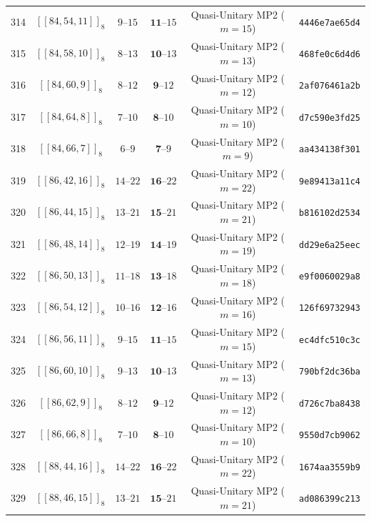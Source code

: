 \documentclass[11pt,a4paper]{article}
\theoremstyle{remark}
\begin{document}
{\begin{longtable}{@{}rccccl@{}}
314 & $[[84,54,11]]_{8}$ & $9\text{--}15$ & $\mathbf{11}\text{--}15$ & Quasi-Unitary MP2 ($m=15$) & \texttt{4446e7ae65d4} \\
315 & $[[84,58,10]]_{8}$ & $8\text{--}13$ & $\mathbf{10}\text{--}13$ & Quasi-Unitary MP2 ($m=13$) & \texttt{468fe0c6d4d6} \\
316 & $[[84,60,9]]_{8}$ & $8\text{--}12$ & $\mathbf{9}\text{--}12$ & Quasi-Unitary MP2 ($m=12$) & \texttt{2af076461a2b} \\
317 & $[[84,64,8]]_{8}$ & $7\text{--}10$ & $\mathbf{8}\text{--}10$ & Quasi-Unitary MP2 ($m=10$) & \texttt{d7c590e3fd25} \\
318 & $[[84,66,7]]_{8}$ & $6\text{--}9$ & $\mathbf{7}\text{--}9$ & Quasi-Unitary MP2 ($m=9$) & \texttt{aa434138f301} \\
319 & $[[86,42,16]]_{8}$ & $14\text{--}22$ & $\mathbf{16}\text{--}22$ & Quasi-Unitary MP2 ($m=22$) & \texttt{9e89413a11c4} \\
320 & $[[86,44,15]]_{8}$ & $13\text{--}21$ & $\mathbf{15}\text{--}21$ & Quasi-Unitary MP2 ($m=21$) & \texttt{b816102d2534} \\
321 & $[[86,48,14]]_{8}$ & $12\text{--}19$ & $\mathbf{14}\text{--}19$ & Quasi-Unitary MP2 ($m=19$) & \texttt{dd29e6a25eec} \\
322 & $[[86,50,13]]_{8}$ & $11\text{--}18$ & $\mathbf{13}\text{--}18$ & Quasi-Unitary MP2 ($m=18$) & \texttt{e9f0060029a8} \\
323 & $[[86,54,12]]_{8}$ & $10\text{--}16$ & $\mathbf{12}\text{--}16$ & Quasi-Unitary MP2 ($m=16$) & \texttt{126f69732943} \\
324 & $[[86,56,11]]_{8}$ & $9\text{--}15$ & $\mathbf{11}\text{--}15$ & Quasi-Unitary MP2 ($m=15$) & \texttt{ec4dfc510c3c} \\
325 & $[[86,60,10]]_{8}$ & $9\text{--}13$ & $\mathbf{10}\text{--}13$ & Quasi-Unitary MP2 ($m=13$) & \texttt{790bf2dc36ba} \\
326 & $[[86,62,9]]_{8}$ & $8\text{--}12$ & $\mathbf{9}\text{--}12$ & Quasi-Unitary MP2 ($m=12$) & \texttt{d726c7ba8438} \\
327 & $[[86,66,8]]_{8}$ & $7\text{--}10$ & $\mathbf{8}\text{--}10$ & Quasi-Unitary MP2 ($m=10$) & \texttt{9550d7cb9062} \\
328 & $[[88,44,16]]_{8}$ & $14\text{--}22$ & $\mathbf{16}\text{--}22$ & Quasi-Unitary MP2 ($m=22$) & \texttt{1674aa3559b9} \\
329 & $[[88,46,15]]_{8}$ & $13\text{--}21$ & $\mathbf{15}\text{--}21$ & Quasi-Unitary MP2 ($m=21$) & \texttt{ad086399c213} \\

\end{longtable}}
\end{document}
